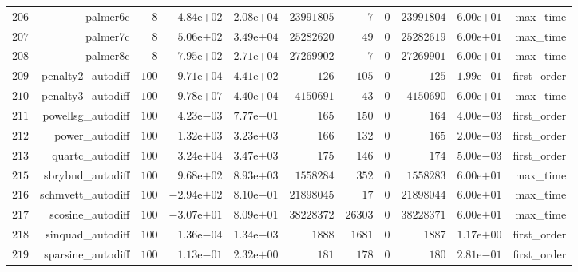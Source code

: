 \documentclass[varwidth=20cm,crop=true]{standalone}
\begin{document}
\begin{longtable}{rrrrrrrrrrr}
  \(   206\) & palmer6c & \(     8\) & \( 4.84\)e\(+02\) & \( 2.08\)e\(+04\) & \(23991805\) & \(     7\) & \(     0\) & \(23991804\) & \( 6.00\)e\(+01\) & max\_time \\
  \(   207\) & palmer7c & \(     8\) & \( 5.06\)e\(+02\) & \( 3.49\)e\(+04\) & \(25282620\) & \(    49\) & \(     0\) & \(25282619\) & \( 6.00\)e\(+01\) & max\_time \\
  \(   208\) & palmer8c & \(     8\) & \( 7.95\)e\(+02\) & \( 2.71\)e\(+04\) & \(27269902\) & \(     7\) & \(     0\) & \(27269901\) & \( 6.00\)e\(+01\) & max\_time \\
  \(   209\) & penalty2\_autodiff & \(   100\) & \( 9.71\)e\(+04\) & \( 4.41\)e\(+02\) & \(   126\) & \(   105\) & \(     0\) & \(   125\) & \( 1.99\)e\(-01\) & first\_order \\
  \(   210\) & penalty3\_autodiff & \(   100\) & \( 9.78\)e\(+07\) & \( 4.40\)e\(+04\) & \(4150691\) & \(    43\) & \(     0\) & \(4150690\) & \( 6.00\)e\(+01\) & max\_time \\
  \(   211\) & powellsg\_autodiff & \(   100\) & \( 4.23\)e\(-03\) & \( 7.77\)e\(-01\) & \(   165\) & \(   150\) & \(     0\) & \(   164\) & \( 4.00\)e\(-03\) & first\_order \\
  \(   212\) & power\_autodiff & \(   100\) & \( 1.32\)e\(+03\) & \( 3.23\)e\(+03\) & \(   166\) & \(   132\) & \(     0\) & \(   165\) & \( 2.00\)e\(-03\) & first\_order \\
  \(   213\) & quartc\_autodiff & \(   100\) & \( 3.24\)e\(+04\) & \( 3.47\)e\(+03\) & \(   175\) & \(   146\) & \(     0\) & \(   174\) & \( 5.00\)e\(-03\) & first\_order \\
  \(   215\) & sbrybnd\_autodiff & \(   100\) & \( 9.68\)e\(+02\) & \( 8.93\)e\(+03\) & \(1558284\) & \(   352\) & \(     0\) & \(1558283\) & \( 6.00\)e\(+01\) & max\_time \\
  \(   216\) & schmvett\_autodiff & \(   100\) & \(-2.94\)e\(+02\) & \( 8.10\)e\(-01\) & \(21898045\) & \(    17\) & \(     0\) & \(21898044\) & \( 6.00\)e\(+01\) & max\_time \\
  \(   217\) & scosine\_autodiff & \(   100\) & \(-3.07\)e\(+01\) & \( 8.09\)e\(+01\) & \(38228372\) & \( 26303\) & \(     0\) & \(38228371\) & \( 6.00\)e\(+01\) & max\_time \\
  \(   218\) & sinquad\_autodiff & \(   100\) & \( 1.36\)e\(-04\) & \( 1.34\)e\(-03\) & \(  1888\) & \(  1681\) & \(     0\) & \(  1887\) & \( 1.17\)e\(+00\) & first\_order \\
  \(   219\) & sparsine\_autodiff & \(   100\) & \( 1.13\)e\(-01\) & \( 2.32\)e\(+00\) & \(   181\) & \(   178\) & \(     0\) & \(   180\) & \( 2.81\)e\(-01\) & first\_order \\

\end{longtable}
\end{document}
